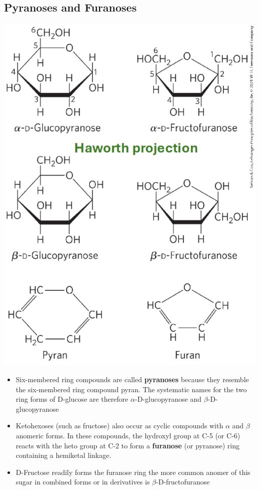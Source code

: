 \documentclass[10pt]{article}
\begin{document}
\subsection*{Pyranoses and Furanoses}
\begin{center}
    \includegraphics*[scale=0.6]{L1_10.png}
\end{center}
\begin{itemize}
    \item Six-membered ring compounds are called \textbf{pyranoses} because they resemble the six-membered ring compound pyran.  The systematic names for the two ring forms of D-glucose are therefore $\alpha$-D-glucopyranose and $\beta$-D-glucopyranose
    \item Ketohexoses (such as fructose) also occur as cyclic compounds with $\alpha$ and $\beta$ anomeric forms.  In these compounds, the hydroxyl group at C-5 (or C-6) reacts with the heto group at C-2 to form a \textbf{furanose} (or pyranose) ring containing a hemiketal linkage.
    \item D-Fructose readily forms the furanose ring the more common anomer of this sugar in combined forms or in derivatives is $\beta$-D-fructofuranose
\end{itemize}
\end{document}
